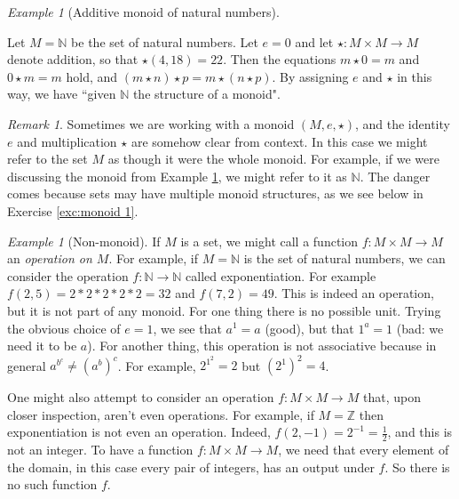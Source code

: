 \documentclass{book}
\def\ZZ{{\mathbb Z}}
\def\NN{{\mathbb N}}
\def\to{\rightarrow}
\def\taking{\colon}
\theoremstyle{remark}
\newtheorem{remark}[subsubsection]{Remark}
\newtheorem{example}[subsubsection]{Example}
\theoremstyle{definition}
\begin{document}
\begin{example}[Additive monoid of natural numbers]\label{ex:monoid 0}

Let $M=\NN$ be the set of natural numbers. Let $e=0$ and let $\star\taking M\times M\to M$ denote addition, so that $\star(4,18)=22$. Then the equations $m\star 0=m$ and $0\star m=m$ hold, and $(m\star n)\star p=m\star (n\star p)$. By assigning $e$ and $\star$ in this way, we have ``given $\NN$ the structure of a monoid".

\end{example}

\begin{remark}

Sometimes we are working with a monoid $(M,e,\star)$, and the identity $e$ and multiplication $\star$ are somehow clear from context. In this case we might refer to the set $M$ as though it were the whole monoid. For example, if we were discussing the monoid from Example \ref{ex:monoid 0}, we might refer to it as $\NN$. The danger comes because sets may have multiple monoid structures, as we see below in Exercise \ref{exc:monoid 1}. 

\end{remark}

\begin{example}[Non-monoid]

If $M$ is a set, we might call a function $f\taking M\times M\to M$ an {\em operation on $M$}. For example, if $M=\NN$ is the set of natural numbers, we can consider the operation $f\taking\NN\to\NN$ called exponentiation. For example $f(2,5)=2*2*2*2*2=32$ and $f(7,2)=49.$ This is indeed an operation, but it is not part of any monoid. For one thing there is no possible unit. Trying the obvious choice of $e=1$, we see that $a^1=a$ (good), but that $1^a=1$ (bad: we need it to be $a$). For another thing, this operation is not associative because in general $a^{b^c}\neq (a^b)^c$. For example, $2^{1^2}=2$ but $(2^1)^2=4$. 

One might also attempt to consider an operation $f\taking M\times M\to M$ that, upon closer inspection, aren't even operations. For example, if $M=\ZZ$ then exponentiation is not even an operation. Indeed, $f(2,-1)=2^{-1}=\frac{1}{2}$, and this is not an integer. To have a function $f\taking M\times M\to M$, we need that every element of the domain, in this case every pair of integers, has an output under $f$. So there is no such function $f$. 

\end{example}
\end{document}
